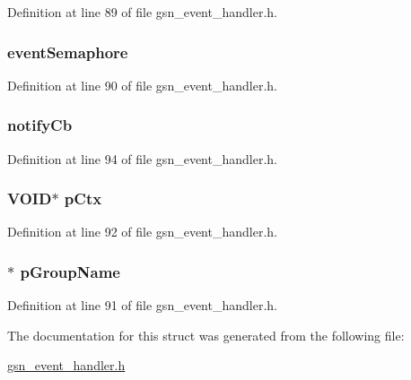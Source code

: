 Definition at line 89 of file gsn\_\-event\_\-handler.h.

\hypertarget{a00069_a7abbbe1ae05b5a78947c630ca20e3811}{
\subsubsection[{eventSemaphore}]{ {\bf eventSemaphore}}}
\label{a00069_a7abbbe1ae05b5a78947c630ca20e3811}


Definition at line 90 of file gsn\_\-event\_\-handler.h.

\hypertarget{a00069_aa0804abb73538a06693f8d7f8f01d51b}{
\subsubsection[{notifyCb}]{ {\bf notifyCb}}}
\label{a00069_aa0804abb73538a06693f8d7f8f01d51b}


Definition at line 94 of file gsn\_\-event\_\-handler.h.

\hypertarget{a00069_a5ef049defd7cc5565bb3c81588802ef7}{
\subsubsection[{pCtx}]{\setlength{\rightskip}{0pt plus 5cm}VOID$\ast$ {\bf pCtx}}}
\label{a00069_a5ef049defd7cc5565bb3c81588802ef7}


Definition at line 92 of file gsn\_\-event\_\-handler.h.

\hypertarget{a00069_aff182528f0e0eb6c3aa245278125f1a0}{
\subsubsection[{pGroupName}]{$\ast$ {\bf pGroupName}}}
\label{a00069_aff182528f0e0eb6c3aa245278125f1a0}


Definition at line 91 of file gsn\_\-event\_\-handler.h.



The documentation for this struct was generated from the following file:\begin{DoxyCompactItemize}
\item 
\hyperlink{a00494}{gsn\_\-event\_\-handler.h}\end{DoxyCompactItemize}
